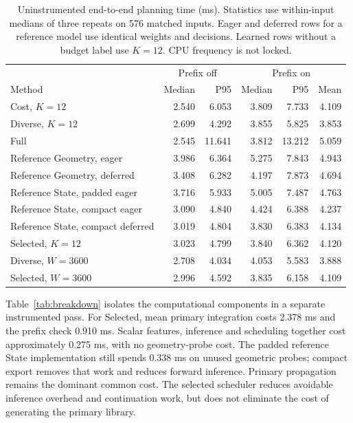 \documentclass[journal]{IEEEtran}
\begin{document}
\begin{table}[!t]
\centering\small
\caption{Uninstrumented end-to-end planning time (ms). Statistics use within-input medians of three repeats on 576 matched inputs. Eager and deferred rows for a reference model use identical weights and decisions. Learned rows without a budget label use $K=12$. CPU frequency is not locked.}
\label{tab:runtime}
\begin{tabular}{lrrrrr}
\toprule
 & \multicolumn{2}{c}{Prefix off} & \multicolumn{3}{c}{Prefix on}\\
Method & Median & P95 & Median & P95 & Mean\\
\midrule
Cost, $K=12$ & 2.540 & 6.053 & 3.809 & 7.733 & 4.109 \\
Diverse, $K=12$ & 2.699 & 4.292 & 3.855 & 5.825 & 3.853 \\
Full & 2.545 & 11.641 & 3.812 & 13.212 & 5.059 \\
Reference Geometry, eager & 3.986 & 6.364 & 5.275 & 7.843 & 4.943 \\
Reference Geometry, deferred & 3.408 & 6.282 & 4.197 & 7.873 & 4.694 \\
Reference State, padded eager & 3.716 & 5.933 & 5.005 & 7.487 & 4.763 \\
Reference State, compact eager & 3.090 & 4.840 & 4.424 & 6.388 & 4.237 \\
Reference State, compact deferred & 3.019 & 4.804 & 3.830 & 6.383 & 4.134 \\
Selected, $K=12$ & 3.023 & 4.799 & 3.840 & 6.362 & 4.120 \\
Diverse, $W=3600$ & 2.708 & 4.034 & 4.053 & 5.583 & 3.888 \\
Selected, $W=3600$ & 2.996 & 4.592 & 3.835 & 6.158 & 4.109 \\
\bottomrule
\end{tabular}
\end{table}

Table~\ref{tab:breakdown} isolates the computational components in a separate instrumented pass. For Selected, mean primary integration costs 2.378 ms and the prefix check 0.910 ms. Scalar features, inference and scheduling together cost approximately 0.275 ms, with no geometry-probe cost. The padded reference State implementation still spends 0.338 ms on unused geometric probes; compact export removes that work and reduces forward inference. Primary propagation remains the dominant common cost. The selected scheduler reduces avoidable inference overhead and continuation work, but does not eliminate the cost of generating the primary library.
\end{document}
